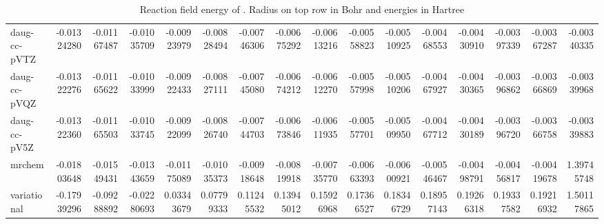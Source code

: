 \documentclass[../Thesis.tex]{subfiles}
\begin{document}
\begin{sidewaystable}
{{\begin{tabular}{l|r|r|r|r|r|r|r|r|r|r|r|r|r|r|r}
  daug-cc-pVTZ & -0.01324280 & -0.01167487 & -0.01035709 & -0.00923979 & -0.00828494 & -0.00746306 & -0.00675292 & -0.00613216 & -0.00558823 & -0.00510925 & -0.00468553 & -0.00430910 & -0.00397339 & -0.00367287 & -0.00340335 \\
  daug-cc-pVQZ & -0.01322276 & -0.01165622 & -0.01033999 & -0.00922433 & -0.00827111 & -0.00745080 & -0.00674212 & -0.00612270 & -0.00557998 & -0.00510206 & -0.00467927 & -0.00430365 & -0.00396862 & -0.00366869 & -0.00339968 \\
  daug-cc-pV5Z & -0.01322360 & -0.01165503 & -0.01033745 & -0.00922099 & -0.00826740 & -0.00744703 & -0.00673846 & -0.00611935 & -0.00557701 & -0.00509950 & -0.00467712 & -0.00430189 & -0.00396720 & -0.00366758 & -0.00339883 \\ \hline
  mrchem & -0.01803648 & -0.01549431 & -0.01343659 & -0.01175089 & -0.01035373 & -0.00918648 & -0.00819918 & -0.00735770 & -0.00663393 & -0.00600921 & -0.00546467 & -0.00498791 & -0.00456817 & -0.00419678 & 1.39745748 \\
  variational & -0.17939296 & -0.09288892 & -0.02280693 & 0.03343679 & 0.07799333 & 0.11245532 & 0.13945012 & 0.15926968 & 0.17366527 & 0.18346729 & 0.18957143 & 0.19266318 & 0.19337582 & 0.19216932 & 1.50117865 \\
  \end{tabular}}}{  \caption{Reaction field energy of . Radius on top row in Bohr and energies in Hartree}\label{tab:Erdatawat}}


\end{sidewaystable}
\end{document}
